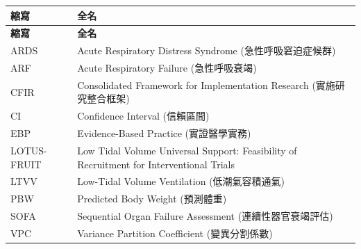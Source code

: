 \documentclass[12pt,a4paper]{article}
\begin{document}
\begin{longtable}{p{4cm}p{10cm}}
\toprule
\textbf{縮寫} & \textbf{全名} \\
\midrule
\endfirsthead

\toprule
\textbf{縮寫} & \textbf{全名} \\
\midrule
\endhead

\bottomrule
\endfoot

ARDS & Acute Respiratory Distress Syndrome (急性呼吸窘迫症候群) \\
ARF & Acute Respiratory Failure (急性呼吸衰竭) \\
CFIR & Consolidated Framework for Implementation Research (實施研究整合框架) \\
CI & Confidence Interval (信賴區間) \\
EBP & Evidence-Based Practice (實證醫學實務) \\
LOTUS-FRUIT & Low Tidal Volume Universal Support: Feasibility of Recruitment for Interventional Trials \\
LTVV & Low-Tidal Volume Ventilation (低潮氣容積通氣) \\
PBW & Predicted Body Weight (預測體重) \\
SOFA & Sequential Organ Failure Assessment (連續性器官衰竭評估) \\
VPC & Variance Partition Coefficient (變異分割係數) \\
\bottomrule
\end{longtable}
\end{document}
